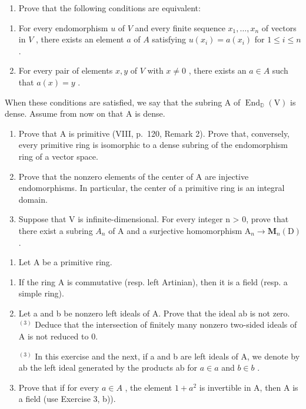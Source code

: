 \begin{enumerate}
\def\labelenumi{\alph{enumi})}
\tightlist
\item
  Prove that the following conditions are equivalent:
\end{enumerate}

\begin{enumerate}
\def\labelenumi{(\roman{enumi})}
\item
  For every endomorphism \(u\) of \(V\) and every finite sequence \(x_{1},\ldots ,x_{n}\) of vectors in \(V\) , there exists an element \(a\) of \(A\) satisfying \(u(x_{i}) = a(x_{i})\) for \(1\leqslant i\leqslant n\) .
\item
  For every pair of elements \(x, y\) of \(V\) with \(x \neq 0\) , there exists an \(a \in A\) such that \(a(x) = y\) .
\end{enumerate}

When these conditions are satisfied, we say that the subring A of \(\operatorname{End}_{\mathbb{D}}(\mathrm{V})\) is dense. Assume from now on that A is dense.

\begin{enumerate}
\def\labelenumi{\alph{enumi})}
\setcounter{enumi}{1}
\item
  Prove that A is primitive (VIII, p.~120, Remark 2). Prove that, conversely, every primitive ring is isomorphic to a dense subring of the endomorphism ring of a vector space.
\item
  Prove that the nonzero elements of the center of A are injective endomorphisms. In particular, the center of a primitive ring is an integral domain.
\item
  Suppose that V is infinite-dimensional. For every integer n \textgreater{} 0, prove that there exist a subring \(A_{n}\) of A and a surjective homomorphism \(\mathrm{A}_{n} \to \mathbf{M}_{n}(\mathrm{D})\) .
\end{enumerate}

\begin{enumerate}
\def\labelenumi{\arabic{enumi})}
\setcounter{enumi}{3}
\tightlist
\item
  Let \(\mathrm{A}\) be a primitive ring.
\end{enumerate}

\begin{enumerate}
\def\labelenumi{\alph{enumi})}
\item
  If the ring A is commutative (resp. left Artinian), then it is a field (resp. a simple ring).
\item
  Let a and b be nonzero left ideals of A. Prove that the ideal ab is not zero. \(^{(3)}\) Deduce that the intersection of finitely many nonzero two-sided ideals of A is not reduced to 0.

  \( ^{(3)} \) In this exercise and the next, if a and b are left ideals of A, we denote by ab the left ideal generated by the products ab for \(a \in a\) and \(b \in b\) .
\item
  Prove that if for every \(a \in A\) , the element \(1 + a^{2}\) is invertible in A, then A is a field (use Exercise 3, b)).
\end{enumerate}


